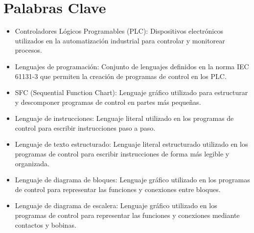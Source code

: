 \documentclass[12pt]{report}
\begin{document}
\chapter*{Palabras Clave}
\begin{itemize}
  \item Controladores Lógicos Programables (PLC): Dispositivos electrónicos utilizados en la automatización industrial para controlar y monitorear procesos.
  \item Lenguajes de programación: Conjunto de lenguajes definidos en la norma IEC 61131-3 que permiten la creación de programas de control en los PLC.
  \item SFC (Sequential Function Chart): Lenguaje gráfico utilizado para estructurar y descomponer programas de control en partes más pequeñas.
  \item Lenguaje de instrucciones: Lenguaje literal utilizado en los programas de control para escribir instrucciones paso a paso.
  \item Lenguaje de texto estructurado: Lenguaje literal estructurado utilizado en los programas de control para escribir instrucciones de forma más legible y organizada.
  \item Lenguaje de diagrama de bloques: Lenguaje gráfico utilizado en los programas de control para representar las funciones y conexiones entre bloques.
  \item Lenguaje de diagrama de escalera: Lenguaje gráfico utilizado en los programas de control para representar las funciones y conexiones mediante contactos y bobinas.
\end{itemize}
\newpage
\end{document}
